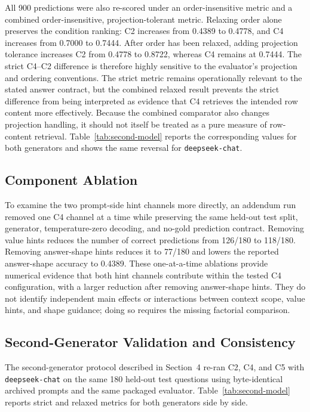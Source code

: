 \documentclass[cmc,article,submit,moreauthors,pdftex]{Definitions/tsp}
\begin{document}
All 900 predictions were also re-scored under an order-insensitive metric and a combined order-insensitive, projection-tolerant metric. Relaxing order alone preserves the condition ranking: C2 increases from 0.4389 to 0.4778, and C4 increases from 0.7000 to 0.7444. After order has been relaxed, adding projection tolerance increases C2 from 0.4778 to 0.8722, whereas C4 remains at 0.7444. The strict C4--C2 difference is therefore highly sensitive to the evaluator's projection and ordering conventions. The strict metric remains operationally relevant to the stated answer contract, but the combined relaxed result prevents the strict difference from being interpreted as evidence that C4 retrieves the intended row content more effectively. Because the combined comparator also changes projection handling, it should not itself be treated as a pure measure of row-content retrieval. Table~\ref{tab:second-model} reports the corresponding values for both generators and shows the same reversal for \texttt{deepseek-chat}.

\subsection{Component Ablation}\label{sect:r3}

To examine the two prompt-side hint channels more directly, an addendum run removed one C4 channel at a time while preserving the same held-out test split, generator, temperature-zero decoding, and no-gold prediction contract. Removing value hints reduces the number of correct predictions from 126/180 to 118/180. Removing answer-shape hints reduces it to 77/180 and lowers the reported answer-shape accuracy to 0.4389. These one-at-a-time ablations provide numerical evidence that both hint channels contribute within the tested C4 configuration, with a larger reduction after removing answer-shape hints. They do not identify independent main effects or interactions between context scope, value hints, and shape guidance; doing so requires the missing factorial comparison.

\subsection{Second-Generator Validation and Consistency}\label{second-generator-validation}

The second-generator protocol described in Section~4 re-ran C2, C4, and C5 with \texttt{deepseek-chat} on the same 180 held-out test questions using byte-identical archived prompts and the same packaged evaluator. Table~\ref{tab:second-model} reports strict and relaxed metrics for both generators side by side.
\end{document}
